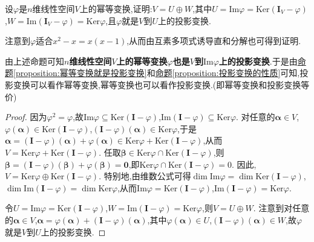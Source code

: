 \documentclass[../../main.tex]{subfiles}%
\begin{document}
\begin{proposition}\label{proposition:幂等变换就是投影变换}
设\(\varphi\)是\(n\)维线性空间\(V\)上的幂等变换,证明:\(V = U\oplus W\),其中\(U = \text{Im}\varphi=\text{Ker}(\boldsymbol{I}_V - \varphi)\),\(W = \text{Im}(\boldsymbol{I}_V - \varphi)=\text{Ker}\varphi\),且\(\varphi\)就是\(V\)到\(U\)上的投影变换.
\end{proposition}
\begin{note}
注意到$\varphi$适合$x^2-x=x(x-1)$,从而由互素多项式诱导直和分解也可得到证明.
\end{note}
\begin{note}
由上述命题可知\textbf{\(n\)维线性空间\(V\)上的幂等变换\(\varphi\)也是\(V\)到\(\text{Im}\varphi\)上的投影变换}.于是由\hyperref[proposition:幂等变换就是投影变换]{命题\ref{proposition:幂等变换就是投影变换}}和\hyperref[proposition:投影变换的性质]{命题\ref{proposition:投影变换的性质}}可知,投影变换可以看作幂等变换,幂等变换也可以看作投影变换.(即\hypertarget{幂等变换和投影变换等价}{幂等变换和投影变换等价})
\end{note}
\begin{proof}
因为\(\varphi^2 = \varphi\),故\(\text{Im}\varphi\subseteq\text{Ker}(\boldsymbol{I} - \varphi)\),\(\text{Im}(\boldsymbol{I} - \varphi)\subseteq\text{Ker}\varphi\). 对任意的\(\boldsymbol{\alpha}\in V\),\(\varphi(\boldsymbol{\alpha})\in\text{Ker}(\boldsymbol{I} - \varphi)\),\((\boldsymbol{I} - \varphi)(\boldsymbol{\alpha})\in\text{Ker}\varphi\),于是\(\boldsymbol{\alpha}=(\boldsymbol{I} - \varphi)(\boldsymbol{\alpha})+\varphi(\boldsymbol{\alpha})\in\text{Ker}\varphi+\text{Ker}(\boldsymbol{I} - \varphi)\),从而\(V = \text{Ker}\varphi+\text{Ker}(\boldsymbol{I} - \varphi)\). 任取\(\boldsymbol{\beta}\in\text{Ker}\varphi\cap\text{Ker}(\boldsymbol{I} - \varphi)\),则\(\boldsymbol{\beta}=(\boldsymbol{I}-\varphi)(\boldsymbol{\beta})+\varphi(\boldsymbol{\beta}) = \boldsymbol{0}\),即\(\text{Ker}\varphi\cap\text{Ker}(\boldsymbol{I}-\varphi)= 0\). 因此,\(V = \text{Ker}\varphi\oplus\text{Ker}(\boldsymbol{I}-\varphi)\). 特别地,由维数公式可得\(\dim\text{Im}\varphi=\dim\text{Ker}(\boldsymbol{I} - \varphi)\),\(\dim\text{Im}(\boldsymbol{I} - \varphi)=\dim\text{Ker}\varphi\),从而\(\text{Im}\varphi=\text{Ker}(\boldsymbol{I} - \varphi)\),\(\text{Im}(\boldsymbol{I} - \varphi)=\text{Ker}\varphi\).

令\(U = \text{Im}\varphi=\text{Ker}(\boldsymbol{I} - \varphi)\),\(W = \text{Im}(\boldsymbol{I} - \varphi)=\text{Ker}\varphi\),则\(V = U\oplus W\). 注意到对任意的\(\boldsymbol{\alpha}\in V\),\(\boldsymbol{\alpha}=\varphi(\boldsymbol{\alpha})+(\boldsymbol{I} - \varphi)(\boldsymbol{\alpha})\),其中\(\varphi(\boldsymbol{\alpha})\in U\),\((\boldsymbol{I} - \varphi)(\boldsymbol{\alpha})\in W\),故\(\varphi\)就是\(V\)到\(U\)上的投影变换.
\end{proof}
\end{document}
